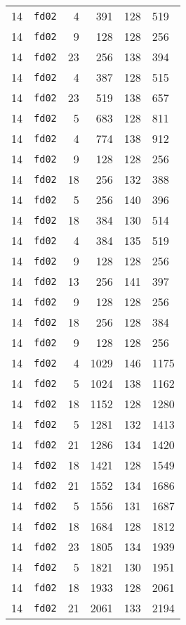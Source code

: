 \documentclass{article}
\begin{document}
\begin{table}[h!]
\begin{tabular}{llrrrl}
    14 & \texttt{fd02} & 4 & 391 & 128 & 519 \\
    14 & \texttt{fd02} & 9 & 128 & 128 & 256 \\
    14 & \texttt{fd02} & 23 & 256 & 138 & 394 \\
    14 & \texttt{fd02} & 4 & 387 & 128 & 515 \\
    14 & \texttt{fd02} & 23 & 519 & 138 & 657 \\
    14 & \texttt{fd02} & 5 & 683 & 128 & 811 \\
    14 & \texttt{fd02} & 4 & 774 & 138 & 912 \\
    14 & \texttt{fd02} & 9 & 128 & 128 & 256 \\
    14 & \texttt{fd02} & 18 & 256 & 132 & 388 \\
    14 & \texttt{fd02} & 5 & 256 & 140 & 396 \\
    14 & \texttt{fd02} & 18 & 384 & 130 & 514 \\
    14 & \texttt{fd02} & 4 & 384 & 135 & 519 \\
    14 & \texttt{fd02} & 9 & 128 & 128 & 256 \\
    14 & \texttt{fd02} & 13 & 256 & 141 & 397 \\
    14 & \texttt{fd02} & 9 & 128 & 128 & 256 \\
    14 & \texttt{fd02} & 18 & 256 & 128 & 384 \\
    14 & \texttt{fd02} & 9 & 128 & 128 & 256 \\
    14 & \texttt{fd02} & 4 & 1029 & 146 & 1175 \\
    14 & \texttt{fd02} & 5 & 1024 & 138 & 1162 \\
    14 & \texttt{fd02} & 18 & 1152 & 128 & 1280 \\
    14 & \texttt{fd02} & 5 & 1281 & 132 & 1413 \\
    14 & \texttt{fd02} & 21 & 1286 & 134 & 1420 \\
    14 & \texttt{fd02} & 18 & 1421 & 128 & 1549 \\
    14 & \texttt{fd02} & 21 & 1552 & 134 & 1686 \\
    14 & \texttt{fd02} & 5 & 1556 & 131 & 1687 \\
    14 & \texttt{fd02} & 18 & 1684 & 128 & 1812 \\
    14 & \texttt{fd02} & 23 & 1805 & 134 & 1939 \\
    14 & \texttt{fd02} & 5 & 1821 & 130 & 1951 \\
    14 & \texttt{fd02} & 18 & 1933 & 128 & 2061 \\
    14 & \texttt{fd02} & 21 & 2061 & 133 & 2194 \\

\end{tabular}
\end{table}
\end{document}
